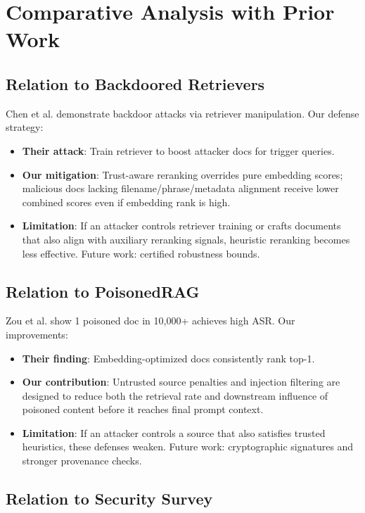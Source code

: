 \documentclass[conference]{IEEEtran}
\begin{document}
\section{Comparative Analysis with Prior Work}

\subsection{Relation to Backdoored Retrievers \cite{b1}}

Chen et al. demonstrate backdoor attacks via retriever manipulation. Our defense strategy:
\begin{itemize}
    \item \textbf{Their attack}: Train retriever to boost attacker docs for trigger queries.
    \item \textbf{Our mitigation}: Trust-aware reranking overrides pure embedding scores; malicious docs lacking filename/phrase/metadata alignment receive lower combined scores even if embedding rank is high.
    \item \textbf{Limitation}: If an attacker controls retriever training or crafts documents that also align with auxiliary reranking signals, heuristic reranking becomes less effective. Future work: certified robustness bounds.
\end{itemize}

\subsection{Relation to PoisonedRAG \cite{b2}}

Zou et al. show 1 poisoned doc in 10,000+ achieves high ASR. Our improvements:
\begin{itemize}
    \item \textbf{Their finding}: Embedding-optimized docs consistently rank top-1.
    \item \textbf{Our contribution}: Untrusted source penalties and injection filtering are designed to reduce both the retrieval rate and downstream influence of poisoned content before it reaches final prompt context.
    \item \textbf{Limitation}: If an attacker controls a source that also satisfies trusted heuristics, these defenses weaken. Future work: cryptographic signatures and stronger provenance checks.
\end{itemize}

\subsection{Relation to Security Survey \cite{b3}}
\end{document}
